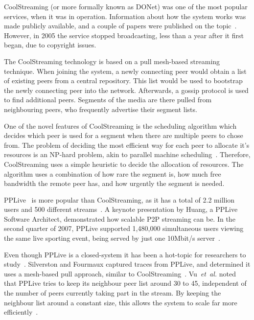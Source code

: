     CoolStreaming (or more formally known as DONet) was one of the most popular services, when it was in operation. Information about how the system works was made publicly available, and a couple of papers were published on the topic~\cite{zhang2005cdd,xie2007cdt}. However, in 2005 the service stopped broadcasting, less than a year after it first began, due to copyright issues.

    The CoolStreaming technology is based on a pull mesh-based streaming technique. When joining the system, a newly connecting peer would obtain a list of existing peers from a central repository.  This list would be used to bootstrap the newly connecting peer into the network. Afterwards, a gossip protocol is used to find additional peers. Segments of the media are there pulled from neighbouring peers, who frequently advertise their segment lists.


    One of the novel features of CoolStreaming is the scheduling algorithm which decides which peer is used for a segment when there are multiple peers to chose from. The problem of deciding the most efficient way for each peer to allocate it's resources is an NP-hard problem, akin to parallel machine scheduling~\cite{cormen2001ita}. Therefore, CoolStreaming uses a simple heuristic to decide the allocation of resources. The algorithm uses a combination of how rare the segment is, how much free bandwidth the remote peer has, and how urgently the segment is needed.

    PPLive~\cite{pplive} is more popular than CoolStreaming, as it has a total of 2.2 million users and 500 different streams~\cite{huang2008cda}. A keynote presentation by Huang, a PPLive Software Architect, demonstrated how scalable P2P streaming can be. In the second quarter of 2007, PPLive supported 1,480,000 simultaneous users viewing the same live sporting event, being served by just one 10Mbit/s server~\cite{huang2007ewp}.

    Even though PPLive is a closed-system it has been a hot-topic for researchers to study~\cite{huang2008cda,silverston2007mpi,vu2007mls,krieger2008aaq,chen2008msc}. Silverston and Fourmaux captured traces from PPLive, and determined it uses a mesh-based pull approach, similar to CoolStreaming~\cite{silverston2007mpi}. Vu~\emph{et~al.} noted that PPLive tries to keep its neighbour peer list around 30 to 45, independent of the number of peers currently taking part in the stream. By keeping the neighbour list around a constant size, this allows the system to scale far more efficiently~\cite{vu2007mls}.

